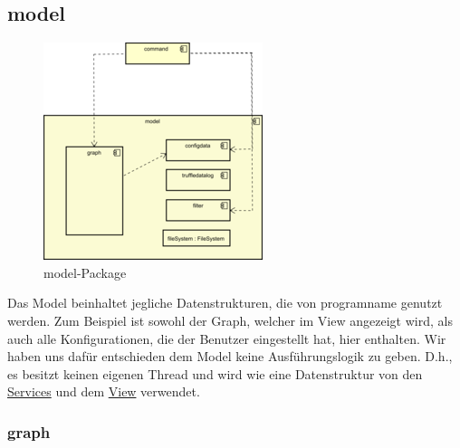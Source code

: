 \subsection{model}
\label{subsec:model}

\begin{figure}[H]
  \centering
  \includegraphics[width=\textwidth]{../diagramimages/model.png}
  \caption{model-Package}
\end{figure}

\medskip
Das Model beinhaltet jegliche Datenstrukturen, die von \gls{programname} genutzt
werden. Zum Beispiel ist sowohl der Graph, welcher im View angezeigt wird,
als auch alle Konfigurationen, die der Benutzer eingestellt hat, hier enthalten. Wir haben uns
dafür entschieden dem Model keine Ausführungslogik zu geben.
D.h., es besitzt keinen eigenen Thread und wird wie eine Datenstruktur von den
\hyperref[subsec:service]{Services} und dem \hyperref[subsec:view]{View} verwendet.

    \subsubsection{graph}
    \label{subsubsec:graph}

